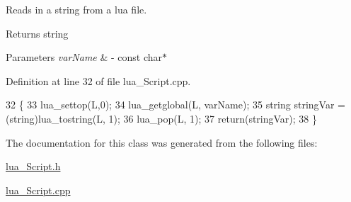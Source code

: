 Reads in a string from a lua file. 

\begin{DoxyReturn}{Returns}
string 
\end{DoxyReturn}

\begin{DoxyParams}{Parameters}
{\em var\+Name} & -\/ const char$\ast$ \\
\hline
\end{DoxyParams}


Definition at line 32 of file lua\+\_\+\+Script.\+cpp.


\begin{DoxyCode}
32                                                           \{
33     lua\_settop(L,0);
34     lua\_getglobal(L, varName);
35     \textcolor{keywordtype}{string} stringVar = (string)lua\_tostring(L, 1);
36     lua\_pop(L, 1);
37     \textcolor{keywordflow}{return}(stringVar);
38 \}
\end{DoxyCode}


The documentation for this class was generated from the following files\+:\begin{DoxyCompactItemize}
\item 
\hyperlink{lua___script_8h}{lua\+\_\+\+Script.\+h}\item 
\hyperlink{lua___script_8cpp}{lua\+\_\+\+Script.\+cpp}\end{DoxyCompactItemize}
